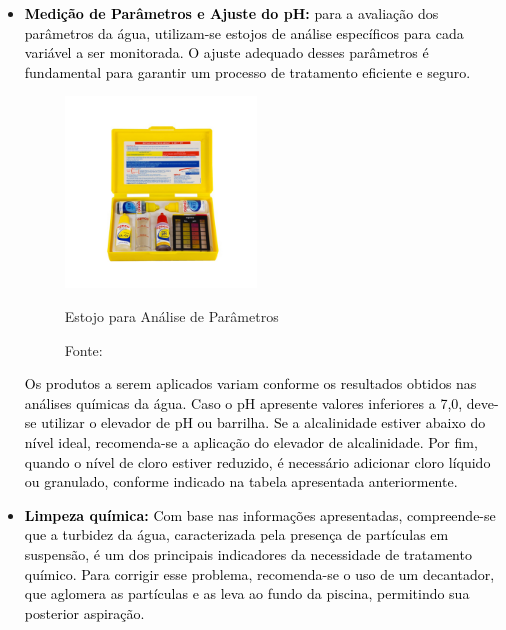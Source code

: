 \begin{itemize}
            \item \textbf{\textcolor{black}{Medição de Parâmetros e Ajuste do pH:}} \textcolor{black}{para a avaliação dos parâmetros da água, utilizam-se estojos de análise específicos para cada variável a ser monitorada. O ajuste adequado desses parâmetros é fundamental para garantir um processo de tratamento eficiente e seguro.}

            \begin{figure}[H]
                    \centering
                    \caption{ }  
                	\centering
                    \label{fig:cont}
                	\includegraphics[width=0.48\textwidth]{imagens/estojoMedidor.png}
                    \caption*{Estojo para Análise de Parâmetros}
                	\caption*{Fonte: \cite{gencoEmpresa}}
            \end{figure}

            \textcolor{black}{Os produtos a serem aplicados variam conforme os resultados obtidos nas análises químicas da água. Caso o pH apresente valores inferiores a 7,0, deve-se utilizar o elevador de pH ou barrilha. Se a alcalinidade estiver abaixo do nível ideal, recomenda-se a aplicação do elevador de alcalinidade. Por fim, quando o nível de cloro estiver reduzido, é necessário adicionar cloro líquido ou granulado, conforme indicado na tabela apresentada anteriormente.}

            \item \textbf{\textcolor{black}{Limpeza química:}} \textcolor{black}{Com base nas informações apresentadas, compreende-se que a turbidez da água, caracterizada pela presença de partículas em suspensão, é um dos principais indicadores da necessidade de tratamento químico. Para corrigir esse problema, recomenda-se o uso de um decantador, que aglomera as partículas e as leva ao fundo da piscina, permitindo sua posterior aspiração.}
            

\end{itemize}
